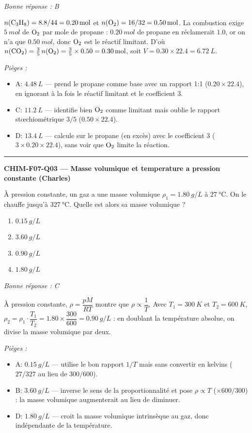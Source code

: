 \documentclass[11pt,a4paper]{article}
\begin{document}
\textit{Bonne réponse : B}\par
$n(\ce{C3H8})=\num{8.8}/44=\qty{0.20}{mol}$ et $n(\ce{O2})=16/32=\qty{0.50}{mol}$. La combustion exige $\qty{5}{mol}$ de $\ce{O2}$ par mole de propane : $\qty{0.20}{mol}$ de propane en réclamerait $\num{1.0}$, or on n'a que $\qty{0.50}{mol}$, donc $\ce{O2}$ est le réactif limitant. D'où $n(\ce{CO2})=\tfrac{3}{5}\,n(\ce{O2})=\tfrac{3}{5}\times\num{0.50}=\qty{0.30}{mol}$, soit $V=\num{0.30}\times\num{22.4}=\qty{6.72}{L}$.\par
\textit{Pièges :}
\begin{itemize}
\item A: $\qty{4.48}{L}$ --- prend le propane comme base avec un rapport 1:1 ($\num{0.20}\times\num{22.4}$), en ignorant à la fois le réactif limitant et le coefficient 3.
\item C: $\qty{11.2}{L}$ --- identifie bien $\ce{O2}$ comme limitant mais oublie le rapport stœchiométrique $3/5$ ($\num{0.50}\times\num{22.4}$).
\item D: $\qty{13.4}{L}$ --- calcule sur le propane (en excès) avec le coefficient 3 ($3\times\num{0.20}\times\num{22.4}$), sans voir que $\ce{O2}$ limite la réaction.
\end{itemize}
\vspace{8pt}\hrule\vspace{8pt}
\noindent\textbf{CHIM-F07-Q03 --- Masse volumique et temperature a pression constante (Charles)}\par
À pression constante, un gaz a une masse volumique $\rho_1=\qty{1.80}{g/L}$ à $\qty{27}{\degreeCelsius}$. On le chauffe jusqu'à $\qty{327}{\degreeCelsius}$. Quelle est alors sa masse volumique ?
\begin{enumerate}[label=\Alph*)]
\item $\qty{0.15}{g/L}$
\item $\qty{3.60}{g/L}$
\item $\qty{0.90}{g/L}$
\item $\qty{1.80}{g/L}$
\end{enumerate}
\textit{Bonne réponse : C}\par
À pression constante, $\rho=\dfrac{pM}{RT}$ montre que $\rho\propto\dfrac{1}{T}$. Avec $T_1=\qty{300}{K}$ et $T_2=\qty{600}{K}$, $\rho_2=\rho_1\cdot\dfrac{T_1}{T_2}=\num{1.80}\times\dfrac{300}{600}=\qty{0.90}{g/L}$ : en doublant la température absolue, on divise la masse volumique par deux.\par
\textit{Pièges :}
\begin{itemize}
\item A: $\qty{0.15}{g/L}$ --- utilise le bon rapport $1/T$ mais sans convertir en kelvins ($27/327$ au lieu de $300/600$).
\item B: $\qty{3.60}{g/L}$ --- inverse le sens de la proportionnalité et pose $\rho\propto T$ ($\times 600/300$) : la masse volumique augmenterait au lieu de diminuer.
\item D: $\qty{1.80}{g/L}$ --- croit la masse volumique intrinsèque au gaz, donc indépendante de la température.
\end{itemize}
\end{document}
